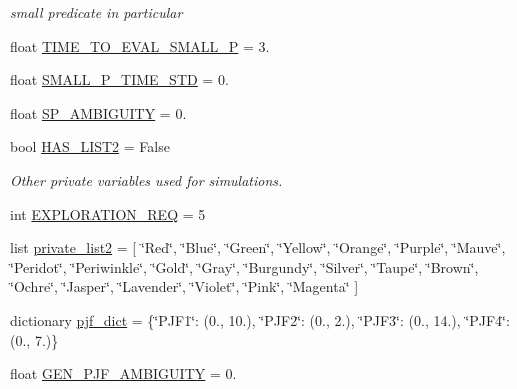\begin{DoxyCompactItemize}
\begin{DoxyCompactList}\small\item\em small predicate in particular \end{DoxyCompactList}\item 
float \mbox{\hyperlink{namespacedynamicfilterapp_1_1toggles_a39ed9966eb905f0836938f04b4b45a05}{T\+I\+M\+E\+\_\+\+T\+O\+\_\+\+E\+V\+A\+L\+\_\+\+S\+M\+A\+L\+L\+\_\+P}} = 3.
\item 
float \mbox{\hyperlink{namespacedynamicfilterapp_1_1toggles_a37bbf61d53811dc1c3968535661346d5}{S\+M\+A\+L\+L\+\_\+\+P\+\_\+\+T\+I\+M\+E\+\_\+\+S\+TD}} = 0.
\item 
float \mbox{\hyperlink{namespacedynamicfilterapp_1_1toggles_a011a3c757a38e684057881c09a3ea686}{S\+P\+\_\+\+A\+M\+B\+I\+G\+U\+I\+TY}} = 0.
\item 
bool \mbox{\hyperlink{namespacedynamicfilterapp_1_1toggles_adf87f452eba2d6c6c2294f74e9ae4e6a}{H\+A\+S\+\_\+\+L\+I\+S\+T2}} = False
\begin{DoxyCompactList}\small\item\em Other private variables used for simulations. \end{DoxyCompactList}\item 
int \mbox{\hyperlink{namespacedynamicfilterapp_1_1toggles_a7a44c9548fafdbeed5cc966f6897a2fc}{E\+X\+P\+L\+O\+R\+A\+T\+I\+O\+N\+\_\+\+R\+EQ}} = 5
\item 
list \mbox{\hyperlink{namespacedynamicfilterapp_1_1toggles_a2d9a68d456cf74dea9d121633b9d0942}{private\+\_\+list2}} = \mbox{[} \char`\"{}Red\char`\"{}, \char`\"{}Blue\char`\"{}, \char`\"{}Green\char`\"{}, \char`\"{}Yellow\char`\"{}, \char`\"{}Orange\char`\"{}, \char`\"{}Purple\char`\"{}, \char`\"{}Mauve\char`\"{}, \char`\"{}Peridot\char`\"{}, \char`\"{}Periwinkle\char`\"{}, \char`\"{}Gold\char`\"{}, \char`\"{}Gray\char`\"{}, \char`\"{}Burgundy\char`\"{}, \char`\"{}Silver\char`\"{}, \char`\"{}Taupe\char`\"{}, \char`\"{}Brown\char`\"{}, \char`\"{}Ochre\char`\"{}, \char`\"{}Jasper\char`\"{}, \char`\"{}Lavender\char`\"{}, \char`\"{}Violet\char`\"{}, \char`\"{}Pink\char`\"{}, \char`\"{}Magenta\char`\"{} \mbox{]}
\item 
dictionary \mbox{\hyperlink{namespacedynamicfilterapp_1_1toggles_ad63ab815953799c46a2af16c2961e907}{pjf\+\_\+dict}} = \{\char`\"{}P\+J\+F1\char`\"{}\+: (0., 10.), \char`\"{}P\+J\+F2\char`\"{}\+: (0., 2.), \char`\"{}P\+J\+F3\char`\"{}\+: (0., 14.), \char`\"{}P\+J\+F4\char`\"{}\+: (0., 7.)\}
\item 
float \mbox{\hyperlink{namespacedynamicfilterapp_1_1toggles_a9da04dbf32dbd4361d7b76531b65eb89}{G\+E\+N\+\_\+\+P\+J\+F\+\_\+\+A\+M\+B\+I\+G\+U\+I\+TY}} = 0.

\end{DoxyCompactItemize}
